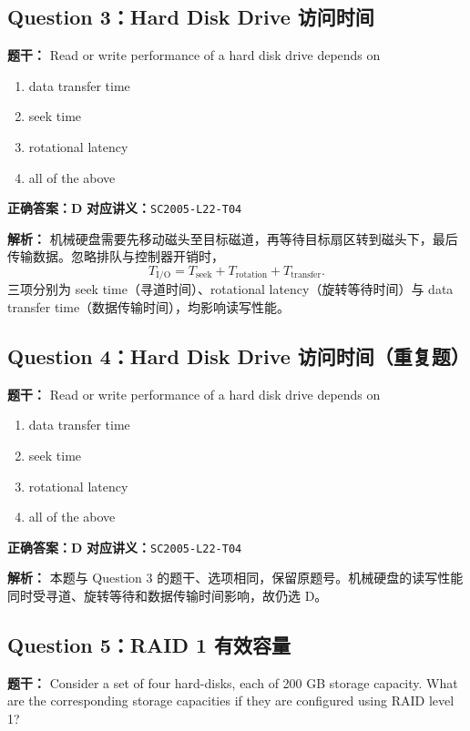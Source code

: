 \documentclass[11pt,a4paper,fontset=fandol]{ctexart}
\renewcommand{\exercisequestion}[2]{%
  \Needspace{5\baselineskip}%
  \subsection{#2}\label{exercise:#1}%
}
\renewenvironment{checkedsolution}
  {\par\nopagebreak[4]\textbf{解析：}\ignorespaces}
  {\par}
\begin{document}
\exercisequestion{SC2005-HW08-Q03}{Question 3：Hard Disk Drive 访问时间}

\textbf{题干：} Read or write performance of a hard disk drive depends on

\begin{enumerate}[label=\Alph*.,leftmargin=2.4em]
  \item data transfer time
  \item seek time
  \item rotational latency
  \item all of the above
\end{enumerate}

\textbf{正确答案：D}\qquad
\textbf{对应讲义：}\texttt{SC2005-L22-T04}

\begin{checkedsolution}
机械硬盘需要先移动磁头至目标磁道，再等待目标扇区转到磁头下，最后传输数据。忽略排队与控制器开销时，
\[
  T_{\mathrm{I/O}}=T_{\mathrm{seek}}+T_{\mathrm{rotation}}+T_{\mathrm{transfer}}.
\]
三项分别为 seek time（寻道时间）、rotational latency（旋转等待时间）与 data transfer time（数据传输时间），均影响读写性能。
\end{checkedsolution}

\exercisequestion{SC2005-HW08-Q04}{Question 4：Hard Disk Drive 访问时间（重复题）}

\textbf{题干：} Read or write performance of a hard disk drive depends on

\begin{enumerate}[label=\Alph*.,leftmargin=2.4em]
  \item data transfer time
  \item seek time
  \item rotational latency
  \item all of the above
\end{enumerate}

\textbf{正确答案：D}\qquad
\textbf{对应讲义：}\texttt{SC2005-L22-T04}

\begin{checkedsolution}
本题与 Question 3 的题干、选项相同，保留原题号。机械硬盘的读写性能同时受寻道、旋转等待和数据传输时间影响，故仍选 D。
\end{checkedsolution}

\exercisequestion{SC2005-HW08-Q05}{Question 5：RAID 1 有效容量}

\textbf{题干：} Consider a set of four hard-disks, each of 200 GB storage capacity. What are the corresponding storage capacities if they are configured using RAID level 1?
\end{document}
